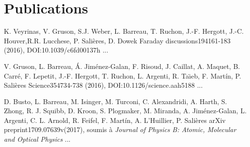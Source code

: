 \part*{Publications}




{K. Veyrinas, V. Gruson, S.J. Weber, L. Barreau, T. Ruchon, J.-F. Hergott, J.-C. Houver,R.R. Lucchese, P. Sali{\`e}res, D. Dowek} 
{Faraday discussions}{194}{161-183 (2016), DOI:10.1039/c6fd00137h}
{...}
\par\noindent

{V. Gruson, L. Barreau, \'{A}. Jiménez-Galan, F. Risoud, J. Caillat, A. Maquet, B. Carr{\'e}, F. Lepetit, J.-F. Hergott, T. Ruchon, L. Argenti, R. Ta{\"\i}eb, F. Mart\'{i}n, P. Sali\`{e}res} 
{Science}{354}{734-738 (2016), DOI:10.1126/science.aah5188}
{...}
\par\noindent

{D. Busto, L. Barreau, M. Isinger, M. Turconi, C. Alexandridi, A. Harth, S. Zhong, R. J. Squibb, D. Kroon, S. Plogmaker, M. Miranda, A. Jiménez-Galan, L. Argenti, C. L. Arnold, R. Feifel, F. Mart\'{i}n, A. L'Huillier, P. Salières} 
{arXiv preprint}{1709.07639v}{(2017), soumis à \textit{Journal of Physics B: Atomic, Molecular and Optical Physics}}
{...}
\par\noindent
